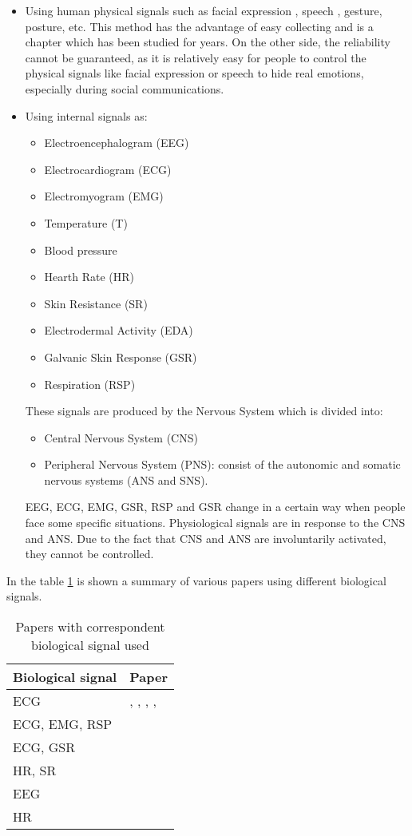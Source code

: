 \begin{itemize}
	\item Using human physical signals such as facial expression \cite{zhang2016facial}, speech \cite{mao2014learning}, gesture, posture, etc. This method has the advantage of easy collecting and is a chapter which has been studied for years. On the other side, the reliability cannot be guaranteed, as it is relatively easy for people to control the physical signals like facial expression or speech to hide real emotions, especially during social communications.
	\item Using internal signals as:
	\begin{itemize}
		\item Electroencephalogram (EEG)
		\item Electrocardiogram (ECG)
		\item Electromyogram (EMG)
		\item Temperature (T)
		\item Blood pressure
		\item Hearth Rate (HR)
		\item Skin Resistance (SR)
		\item Electrodermal Activity (EDA)
		\item Galvanic Skin Response (GSR)
		\item Respiration (RSP)
	\end{itemize}
	These signals are produced by the Nervous System which is divided into:
	\begin{itemize}
		\item Central Nervous System (CNS)
		\item Peripheral Nervous System (PNS): consist of the autonomic and somatic nervous systems (ANS and SNS).
	\end{itemize}
	EEG, ECG, EMG, GSR, RSP and GSR change in a certain way when people face some specific situations. Physiological signals are in response to the CNS and ANS. Due to the fact that CNS and ANS are involuntarily activated, they cannot be controlled.
\end{itemize}
In the table \ref{table:biological_signals} is shown a summary of various papers using different biological signals.
\begin{table}[h!]
	\centering
	\begin{tabular}{|l|l|}
		\hline
		Biological signal & Paper\\ [0.5ex] 
		\hline \hline ECG & \cite{dissanayake2019ensemble}, \cite{hsu2017automatic},  \cite{naji2014classification}, \cite{naji2015emotion}, \cite{cai2009research}  \\ 
		\hline ECG, EMG, RSP & \cite{kim2008emotion} \\
		\hline ECG, GSR & \cite{goshvarpour2017accurate} \\ 
		\hline HR, SR & \cite{yoo2005neural} \\
		\hline EEG & \cite{sourina2012real} \\
		\hline HR & \cite{nardelli2015recognizing} \\
		\hline
	\end{tabular}
	\caption{Papers with correspondent biological signal used}
	\label{table:biological_signals}
\end{table}
